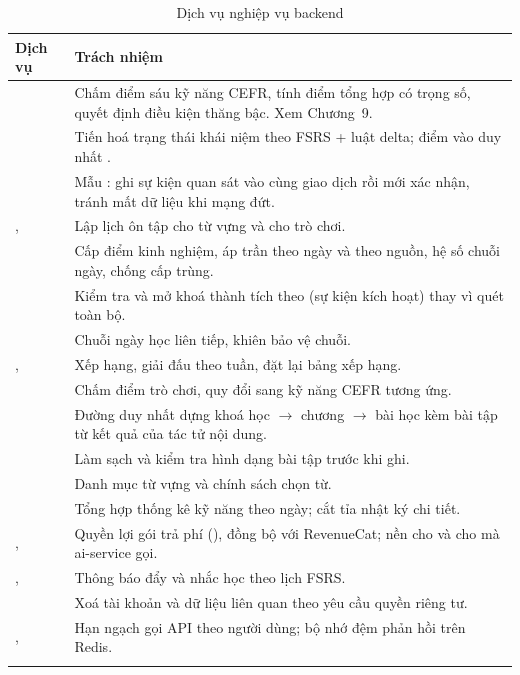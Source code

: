 \begin{longtable}{L{5.0cm} L{8.6cm}}
\toprule
\textbf{Dịch vụ} & \textbf{Trách nhiệm}\\
\midrule
\endhead
{} & Chấm điểm sáu kỹ năng CEFR, tính điểm tổng hợp có trọng số, quyết định điều kiện thăng bậc. Xem Chương~9.\\
 & Tiến hoá trạng thái khái niệm theo FSRS + luật delta; điểm vào duy nhất .\\
 & Mẫu : ghi sự kiện quan sát vào cùng giao dịch rồi mới xác nhận, tránh mất dữ liệu khi mạng đứt.\\
,  & Lập lịch ôn tập cho từ vựng và cho trò chơi.\\
 & Cấp điểm kinh nghiệm, áp trần theo ngày và theo nguồn, hệ số chuỗi ngày, chống cấp trùng.\\
 & Kiểm tra và mở khoá thành tích theo  (sự kiện kích hoạt) thay vì quét toàn bộ.\\
 & Chuỗi ngày học liên tiếp, khiên bảo vệ chuỗi.\\
,  & Xếp hạng, giải đấu theo tuần, đặt lại bảng xếp hạng.\\
 & Chấm điểm trò chơi, quy đổi sang kỹ năng CEFR tương ứng.\\
 & Đường duy nhất dựng khoá học $\rightarrow$ chương $\rightarrow$ bài học kèm bài tập từ kết quả của tác tử nội dung.\\
 & Làm sạch và kiểm tra hình dạng bài tập trước khi ghi.\\
 & Danh mục từ vựng và chính sách chọn từ.\\
 & Tổng hợp thống kê kỹ năng theo ngày; cắt tỉa nhật ký chi tiết.\\
,  & Quyền lợi gói trả phí (), đồng bộ với RevenueCat; nền cho  và cho  mà ai-service gọi.\\
,  & Thông báo đẩy và nhắc học theo lịch FSRS.\\
 & Xoá tài khoản và dữ liệu liên quan theo yêu cầu quyền riêng tư.\\
,  & Hạn ngạch gọi API theo người dùng; bộ nhớ đệm phản hồi trên Redis.\\
\bottomrule
\caption{Dịch vụ nghiệp vụ backend}
\end{longtable}

